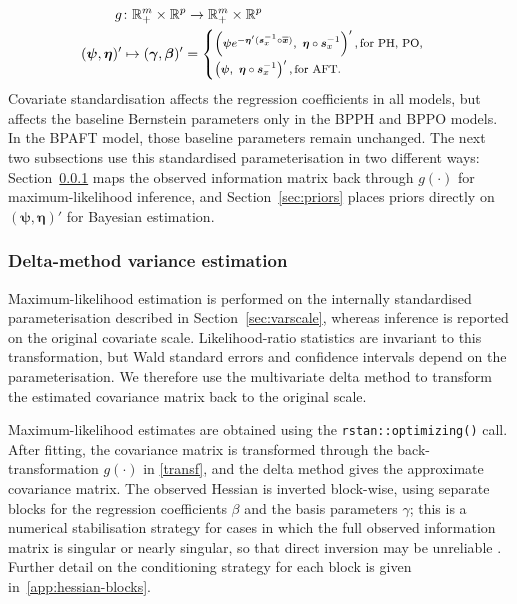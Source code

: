 \documentclass[5p,lefttitle]{elsarticle}
\begin{document}
{{
\begin{align}
g &\colon \mathbb{R}_+^m \times \mathbb{R}^p
\to \mathbb{R}_+^m \times \mathbb{R}^p \nonumber \\
(\boldsymbol{\psi}, \boldsymbol{\eta})'
&\mapsto
(\boldsymbol{\gamma}, \boldsymbol{\beta})'
=
\begin{cases}\footnotesize
\left(
\boldsymbol{\psi}e^{-\boldsymbol{\eta}'(\boldsymbol{s}_x^{-1} \circ
\overline{\boldsymbol{x}})},
\ \boldsymbol{\eta} \circ \boldsymbol{s}_x^{-1}
\right)', \text{for PH, PO}, \\[1ex]
\footnotesize\left(
\boldsymbol{\psi},
\ \boldsymbol{\eta} \circ \boldsymbol{s}_x^{-1}
\right)',   \text{for AFT}.\label{transf}
\end{cases}
\end{align}\normalsize}
Covariate standardisation affects the regression coefficients in all
models, but affects the baseline Bernstein parameters only in the BPPH
and BPPO models. In the BPAFT model, those baseline parameters remain
unchanged. The next two subsections use this standardised
parameterisation in two different ways: Section~\ref{sec:delta-method} maps the
observed information matrix back through \(g(\cdot)\) for
maximum-likelihood inference, and Section~\ref{sec:priors} places priors
directly on \((\boldsymbol{\psi}, \boldsymbol{\eta})'\) for Bayesian
estimation.

\subsubsection{Delta-method variance estimation}\label{sec:delta-method}

Maximum-likelihood estimation is performed on the internally
standardised parameterisation described in Section~\ref{sec:varscale},
whereas inference is reported on the original covariate scale.
Likelihood-ratio statistics are invariant to this transformation, but
Wald standard errors and confidence intervals depend on the
parameterisation. We therefore use the multivariate delta method to
transform the estimated covariance matrix back to the original scale.

Maximum-likelihood estimates are obtained using the
\texttt{rstan::optimizing()} call. After
fitting, the covariance matrix is transformed through the
back-transformation \(g(\cdot)\) in \eqref{transf}, and the delta method gives the approximate covariance matrix.
The observed Hessian is inverted block-wise, using separate blocks for the
regression coefficients \(\beta\) and the basis parameters \(\gamma\); this
is a numerical stabilisation strategy for cases in which the full observed
information matrix is singular or nearly singular, so that direct inversion
may be unreliable \citep{nocedal2006numerical}. Further detail on the
conditioning strategy for each block is given in~\ref{app:hessian-blocks}.

}
\end{document}
